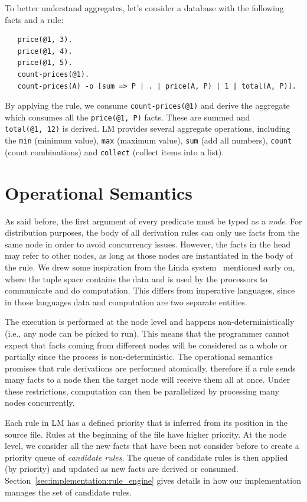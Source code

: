 To better understand aggregates, let's consider a database with the following
facts and a rule:

{\small
\begin{Verbatim}
   price(@1, 3).
   price(@1, 4).
   price(@1, 5).
   count-prices(@1).
   count-prices(A) -o [sum => P | . | price(A, P) | 1 | total(A, P)].
\end{Verbatim}
}

By applying the rule, we consume \texttt{count-prices(@1)} and derive the
aggregate which consumes all the \texttt{price(@1, P)} facts.  These are summed
and \texttt{total(@1,~12)} is derived. LM provides several aggregate operations,
including the \texttt{min} (minimum value), \texttt{max} (maximum value),
\texttt{sum} (add all numbers), \texttt{count} (count combinations) and
\texttt{collect} (collect items into a list).

\section{Operational Semantics}

As said before, the first argument of every predicate must be typed as a
\emph{node}.  For distribution purposes, the body of all derivation rules can
only use facts from the same node in order to avoid concurrency issues.
However, the facts in the head may refer to other nodes, as long as those nodes
are instantiated in the body of the rule.  We drew some inspiration from the
Linda system~\cite{linda} mentioned early on, where the tuple space contains
the data and is used by the processors to communicate and do computation.  This
differs from imperative languages, since in those languages data and computation
are two separate entities.

The execution is performed at the node level and happens non-deterministically
(i.e., any node can be picked to run). This means that the programmer cannot
expect that facts coming from different nodes will be considered as a whole or
partially since the process is non-deterministic. The operational semantics
promises that rule derivations are performed atomically, therefore if a rule
sends many facts to a node then the target node will receive them all at once.
Under these restrictions, computation can then be parallelized by processing
many nodes concurrently.

Each rule in LM has a defined priority that is inferred from its position in the
source file.  Rules at the beginning of the file have higher priority. At the
node level, we consider all the new facts that have been not consider before to
create a priority queue of \emph{candidate rules}.  The queue of candidate rules
is then applied (by priority) and updated as new facts are derived or consumed.
Section~\ref{sec:implementation:rule_engine} gives details in how our
implementation manages the set of candidate rules.

